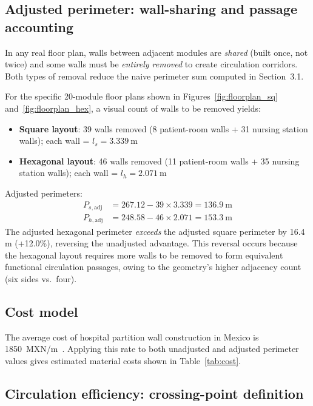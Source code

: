 \documentclass[12pt,a4paper]{article}
\begin{document}
\subsection{Adjusted perimeter: wall-sharing and passage accounting}
\label{sec:methods_adjusted}

In any real floor plan, walls between adjacent modules are \emph{shared}
(built once, not twice) and some walls must be \emph{entirely removed}
to create circulation corridors.
Both types of removal reduce the naive perimeter sum computed in
Section~3.1.

For the specific 20-module floor plans shown in Figures~\ref{fig:floorplan_sq}
and~\ref{fig:floorplan_hex}, a visual count of walls to be removed yields:
\begin{itemize}[noitemsep]
  \item \textbf{Square layout}: 39 walls removed (8 patient-room walls + 31 nursing station walls); each wall = $l_s = \SI{3.339}{\metre}$
  \item \textbf{Hexagonal layout}: 46 walls removed (11 patient-room walls + 35 nursing station walls); each wall = $l_h = \SI{2.071}{\metre}$
\end{itemize}
Adjusted perimeters:
\begin{align}
  P_{s,\text{adj}} &= 267.12 - 39 \times 3.339 = \SI{136.9}{\metre} \label{eq:psadj}\\
  P_{h,\text{adj}} &= 248.58 - 46 \times 2.071 = \SI{153.3}{\metre} \label{eq:phadj}
\end{align}
The adjusted hexagonal perimeter \emph{exceeds} the adjusted square perimeter
by 16.4\,m (+12.0\%), reversing the unadjusted advantage.
This reversal occurs because the hexagonal layout requires more walls to be
removed to form equivalent functional circulation passages, owing to the
geometry's higher adjacency count (six sides vs.\ four).

\subsection{Cost model}

The average cost of hospital partition wall construction in Mexico is
\SI{1850}{MXN/m}~\cite{imss2022cost}.
Applying this rate to both unadjusted and adjusted perimeter values gives
estimated material costs shown in Table~\ref{tab:cost}.

\subsection{Circulation efficiency: crossing-point definition}
\label{sec:methods_crossing}
\end{document}
